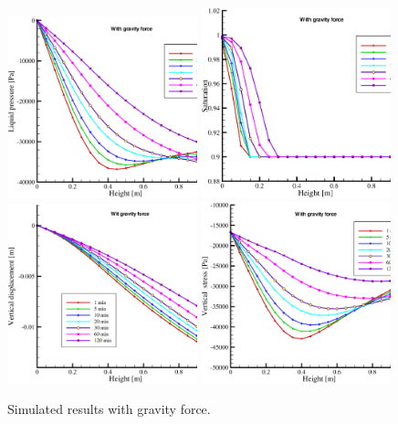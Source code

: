 \begin{figure}[!t]
\begin{center}
\includegraphics[width=0.49\textwidth]{chapter_14/figures/fig_14_2_14_a}
\includegraphics[width=0.49\textwidth]{chapter_14/figures/fig_14_2_14_b}
\includegraphics[width=0.49\textwidth]{chapter_14/figures/fig_14_2_14_c}
\includegraphics[width=0.49\textwidth]{chapter_14/figures/fig_14_2_14_d}
\end{center}
\caption{Simulated results with gravity force.}
\label{fig_HM_sat_g}
\end{figure}

